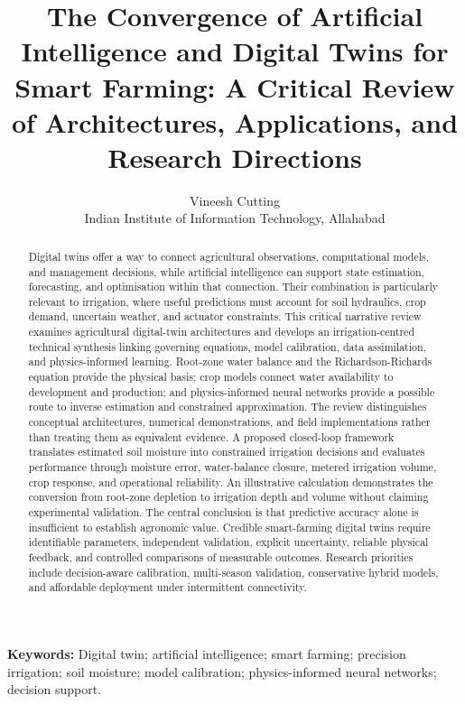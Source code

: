 \documentclass[11pt,a4paper]{article}
\title{The Convergence of Artificial Intelligence and Digital Twins for Smart Farming: A Critical Review of Architectures, Applications, and Research Directions}
\author{Vineesh Cutting\\Indian Institute of Information Technology, Allahabad}
\date{}
\begin{document}
\maketitle

\begin{abstract}

Digital twins offer a way to connect agricultural observations, computational models, and management decisions, while artificial intelligence can support state estimation, forecasting, and optimisation within that connection. Their combination is particularly relevant to irrigation, where useful predictions must account for soil hydraulics, crop demand, uncertain weather, and actuator constraints. This critical narrative review examines agricultural digital-twin architectures and develops an irrigation-centred technical synthesis linking governing equations, model calibration, data assimilation, and physics-informed learning. Root-zone water balance and the Richardson-Richards equation provide the physical basis; crop models connect water availability to development and production; and physics-informed neural networks provide a possible route to inverse estimation and constrained approximation. The review distinguishes conceptual architectures, numerical demonstrations, and field implementations rather than treating them as equivalent evidence. A proposed closed-loop framework translates estimated soil moisture into constrained irrigation decisions and evaluates performance through moisture error, water-balance closure, metered irrigation volume, crop response, and operational reliability. An illustrative calculation demonstrates the conversion from root-zone depletion to irrigation depth and volume without claiming experimental validation. The central conclusion is that predictive accuracy alone is insufficient to establish agronomic value. Credible smart-farming digital twins require identifiable parameters, independent validation, explicit uncertainty, reliable physical feedback, and controlled comparisons of measurable outcomes. Research priorities include decision-aware calibration, multi-season validation, conservative hybrid models, and affordable deployment under intermittent connectivity.

\end{abstract}

\noindent\textbf{Keywords:} Digital twin; artificial intelligence; smart farming; precision irrigation; soil moisture; model calibration; physics-informed neural networks; decision support.
\end{document}
